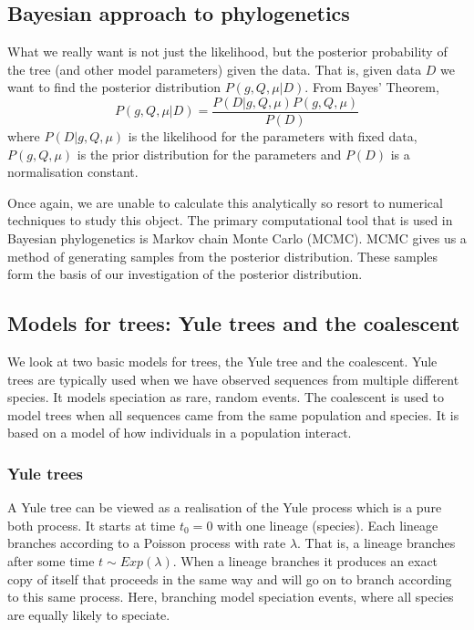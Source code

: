 \documentclass[11pt]{article}
\begin{document}
 
 \subsection{Bayesian approach to phylogenetics}
 
 What we really want is not just the likelihood, but the posterior probability of the tree (and other model parameters) given the data.  That is, given data $D$ we want to find the posterior distribution $P(g,Q,\mu |D)$.  From Bayes' Theorem, 
 \[  P(g,Q,\mu |D) = \frac{P(D|g,Q,\mu)P(g,Q,\mu)}{P(D)} \]
 where $P(D|g,Q,\mu)$ is the likelihood for the parameters with fixed data, $P(g,Q,\mu)$ is the prior distribution for the parameters and $P(D)$ is a normalisation constant.  
 
 Once again, we are unable to calculate this analytically so resort to numerical techniques to study this object.  The primary computational tool that is used in Bayesian phylogenetics is Markov chain Monte Carlo (MCMC).  MCMC gives us a method of generating samples from the posterior distribution.  These samples form the basis of our investigation of the posterior distribution.


 \subsection{Models for trees: Yule trees and the coalescent}
 
 We look at two basic models for trees, the Yule tree and the coalescent.  Yule trees are typically used when we have observed sequences from multiple different species.  It models speciation as rare, random events.   The coalescent is used to model trees when all sequences came from the same population and species.  It is based on a model of how individuals in a population interact. 
  
 \subsubsection{Yule trees}
 
A Yule tree can be viewed as a realisation of  the Yule process which is a pure both process.  It starts at time $t_0 = 0$ with one lineage (species).  Each lineage branches according  to a Poisson process with rate $\lambda$.  That is, a lineage branches after some time $t \sim Exp(\lambda)$.  When a lineage branches it produces an exact copy of itself that proceeds in the same way and will go on to branch according to this same process.  Here, branching model speciation events, where all species are equally likely to speciate.  
\end{document}
